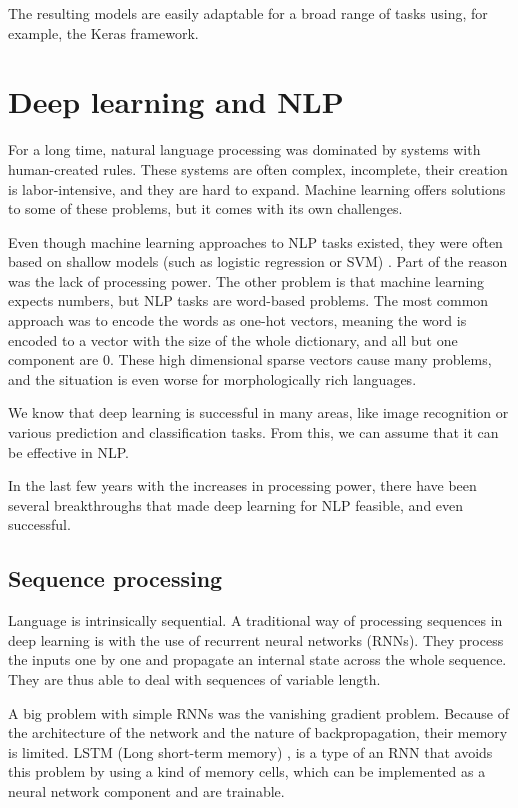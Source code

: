 \documentclass[
  printed, %
  color,   %
  table,   %
  oneside, %
  lof,     %
  lot,     %
]{fithesis3}
\begin{document}
The resulting models are easily adaptable for a broad range of tasks using, for example, the Keras framework.


\chapter{Deep learning and NLP}
For a long time, natural language processing was dominated by systems with human-created rules. These systems are often complex, incomplete, their creation is labor-intensive, and they are hard to expand. Machine learning offers solutions to some of these problems, but it comes with its own challenges.

Even though machine learning approaches to NLP tasks existed, they were often based on shallow models (such as logistic regression or SVM) \parencite{deepNLP}. Part of the reason was the lack of processing power. The other problem is that machine learning expects numbers, but NLP tasks are word-based problems. The most common approach was to encode the words as one-hot vectors, meaning the word is encoded to a vector with the size of the whole dictionary, and all but one component are 0.  These high dimensional sparse vectors cause many problems, and the situation is even worse for morphologically rich languages.

We know that deep learning\parencite{deepNLP} is successful in many areas, like image recognition or various prediction and classification tasks. From this, we can assume that it can be effective in NLP.

In the last few years with the increases in processing power, there have been several breakthroughs that made deep learning for NLP feasible, and even successful.

\section{Sequence processing}
Language is intrinsically sequential. A traditional way of processing sequences in deep learning is with the use of recurrent neural networks (RNNs). They process the inputs one by one and propagate an internal state across the whole sequence. They are thus able to deal with sequences of variable length. 

A big problem with simple RNNs was the vanishing gradient problem. Because of the architecture of the network and the nature of backpropagation, their memory is limited. LSTM (Long short-term memory) \parencite{lstm}, \parencite{lstm-info} is a type of an RNN that avoids this problem by using a kind of memory cells, which can be implemented as a neural network component and are trainable.
\end{document}
